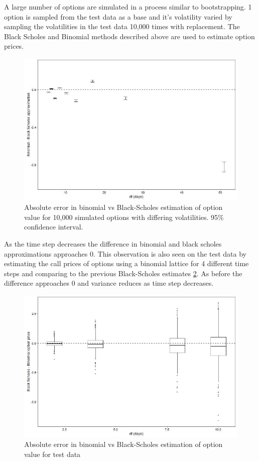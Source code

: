 \documentclass{sig-alternate-05-2015}
\begin{document}
A large number of options are simulated in a process similar to bootstrapping. 1 option is sampled from the test data as a base and  it's volatility varied by sampling the volatilities in the test data 10,000 times with replacement. The Black Scholes and Binomial methods described above are used to estimate option prices. 

\begin{figure}[h]
\includegraphics[width=0.8\linewidth]{../Plots/Q5_1.jpg}
\centering
\caption{Absolute error in binomial vs Black-Scholes estimation of option value for 10,000 simulated options with differing volatilities. 95\% confidence interval.}
\label{fig:Q5_1}
\end{figure} 

As the time step decreases the difference in binomial and black scholes approximations approaches 0. This observation is also seen on the test data by estimating the call prices of options using a binomial lattice for 4 different time steps and comparing to the previous Black-Scholes estimates \ref{fig:Q5_2}. As before the difference approaches 0 and variance reduces as time step decreases. 

\begin{figure}[h]
\includegraphics[width=0.8\linewidth]{../Plots/Q5_2.jpg}
\centering
\caption{Absolute error in binomial vs Black-Scholes estimation of option value for test data}
\label{fig:Q5_2}
\end{figure} 
\end{document}
